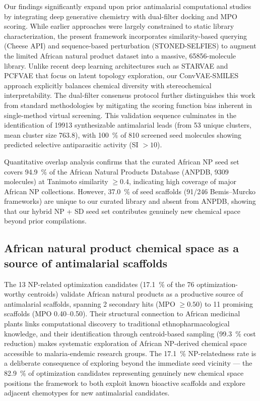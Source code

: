 \documentclass[journal=jcisd8,manuscript=article]{achemso}
\begin{document}
Our findings significantly expand upon prior antimalarial computational studies \cite{NtieKang2018, Simoben2020} by integrating deep generative chemistry with dual-filter docking and MPO scoring. While earlier approaches were largely constrained to static library characterization, the present framework incorporates similarity-based querying (Cheese API) and sequence-based perturbation (STONED-SELFIES) to augment the limited African natural product dataset into a massive, \num{65856}-molecule library. Unlike recent deep learning architectures such as STARVAE \cite{Kwon2025} and PCFVAE \cite{Bhadwal2025} that focus on latent topology exploration, our ConvVAE-SMILES approach explicitly balances chemical diversity with stereochemical interpretability. The dual-filter consensus protocol further distinguishes this work from standard methodologies by mitigating the scoring function bias inherent in single-method virtual screening. This validation sequence culminates in the identification of \num{19913} synthesizable antimalarial leads (from \num{53} unique clusters, mean cluster size \num{763.8}), with \qty{100}{\percent} of \num{810} screened seed molecules showing predicted selective antiparasitic activity (SI $> \num{10}$).

Quantitative overlap analysis confirms that the curated African NP seed set covers \qty{94.9}{\percent} of the African Natural Products Database (ANPDB, \num{9309} molecules) at Tanimoto similarity $\geq \num{0.4}$, indicating high coverage of major African NP collections. However, \qty{37.0}{\percent} of seed scaffolds (\num{91}/\num{246} Bemis--Murcko frameworks) are unique to our curated library and absent from ANPDB, showing that our hybrid NP + SD seed set contributes genuinely new chemical space beyond prior compilations.


\subsection*{African natural product chemical space as a source of antimalarial scaffolds}

The \num{13} NP-related optimization candidates (\qty{17.1}{\percent} of the \num{76} optimization-worthy centroids) validate African natural products as a productive source of antimalarial scaffolds, spanning \num{2} secondary hits (MPO $\geq \num{0.50}$) to \num{11} promising scaffolds (MPO \numrange{0.40}{0.50}). Their structural connection to African medicinal plants links computational discovery to traditional ethnopharmacological knowledge, and their identification through centroid-based sampling (\qty{99.3}{\percent} cost reduction) makes systematic exploration of African NP-derived chemical space accessible to malaria-endemic research groups. The \qty{17.1}{\percent} NP-relatedness rate is a deliberate consequence of exploring beyond the immediate seed vicinity — the \qty{82.9}{\percent} of optimization candidates representing genuinely new chemical space positions the framework to both exploit known bioactive scaffolds and explore adjacent chemotypes for new antimalarial candidates.
\end{document}
